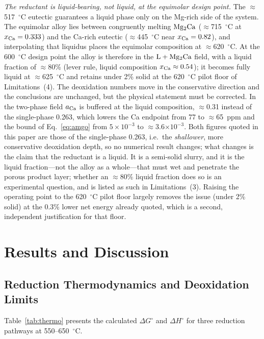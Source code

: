 \documentclass[pdflatex,sn-basic,Numbered]{sn-jnl}
\begin{document}
\emph{The reductant is liquid-bearing, not liquid, at the equimolar design point.} The $\approx$517~$^{\circ}$C eutectic guarantees a liquid phase only on the Mg-rich side of the system. The equimolar alloy lies between congruently melting $\ce{Mg2Ca}$ ($\approx$715~$^{\circ}$C at $x_{\ce{Ca}} = 0.333$) and the Ca-rich eutectic ($\approx$445~$^{\circ}$C near $x_{\ce{Ca}} = 0.82$), and interpolating that liquidus places the equimolar composition at $\approx$620~$^{\circ}$C. At the 600~$^{\circ}$C design point the alloy is therefore in the $\mathrm{L}+\ce{Mg2Ca}$ field, with a liquid fraction of $\approx$80\% (lever rule, liquid composition $x_{\ce{Ca}} \approx 0.54$); it becomes fully liquid at $\approx$625~$^{\circ}$C and retains under 2\% solid at the 620~$^{\circ}$C pilot floor of Limitations~(4). The deoxidation numbers move in the conservative direction and the conclusions are unchanged, but the physical statement must be corrected. In the two-phase field $a_{\ce{Ca}}$ is buffered at the liquid composition, $\approx$0.31 instead of the single-phase 0.263, which lowers the Ca endpoint from 77 to $\approx$65~ppm and the bound of Eq.~\ref{eq:amgo} from $5\times10^{-3}$ to $\approx$3.6$\times10^{-3}$. Both figures quoted in this paper are those of the single-phase 0.263, i.e.\ the \emph{shallower}, more conservative deoxidation depth, so no numerical result changes; what changes is the claim that the reductant is a liquid. It is a semi-solid slurry, and it is the liquid fraction---not the alloy as a whole---that must wet and penetrate the porous product layer; whether an $\approx$80\% liquid fraction does so is an experimental question, and is listed as such in Limitations~(3). Raising the operating point to the 620~$^{\circ}$C pilot floor largely removes the issue (under 2\% solid) at the 0.3\% lower net energy already quoted, which is a second, independent justification for that floor.

\section{Results and Discussion}\label{sec:results}

\subsection{Reduction Thermodynamics and Deoxidation Limits}

Table~\ref{tab:thermo} presents the calculated $\Delta G^{\circ}$ and $\Delta H^{\circ}$ for three reduction pathways at 550--650~$^{\circ}$C.
\end{document}
